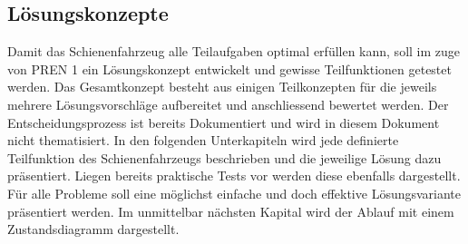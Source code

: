 \documentclass[../../main.tex]{subfiles}
\begin{document}
\subsection{Lösungskonzepte}
Damit das Schienenfahrzeug alle Teilaufgaben optimal erfüllen kann, soll im zuge von PREN 1 ein Lösungskonzept entwickelt und gewisse Teilfunktionen getestet werden. Das Gesamtkonzept besteht aus einigen Teilkonzepten für die jeweils mehrere Lösungsvorschläge aufbereitet und anschliessend bewertet werden. Der Entscheidungsprozess ist bereits Dokumentiert und wird in diesem Dokument nicht thematisiert. In den folgenden Unterkapiteln wird jede definierte Teilfunktion des Schienenfahrzeugs beschrieben und die jeweilige Lösung dazu präsentiert. Liegen bereits praktische Tests vor werden diese ebenfalls dargestellt. Für alle Probleme soll eine möglichst einfache und doch effektive Lösungsvariante präsentiert werden.
Im unmittelbar nächsten Kapital wird der Ablauf mit einem Zustandsdiagramm dargestellt.
\end{document}
